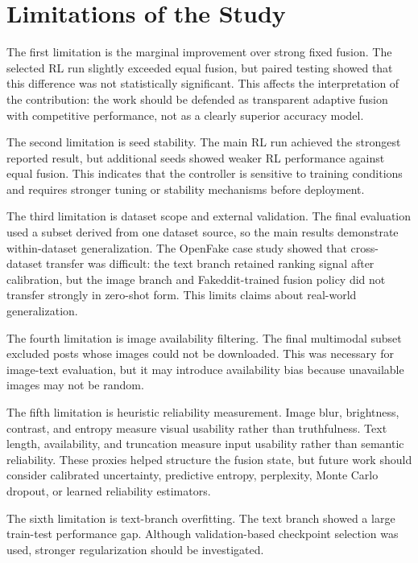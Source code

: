 \section{Limitations of the Study}


The first limitation is the marginal improvement over strong fixed fusion. The selected RL run slightly exceeded equal fusion, but paired testing showed that this difference was not statistically significant. This affects the interpretation of the contribution: the work should be defended as transparent adaptive fusion with competitive performance, not as a clearly superior accuracy model.


The second limitation is seed stability. The main RL run achieved the strongest reported result, but additional seeds showed weaker RL performance against equal fusion. This indicates that the controller is sensitive to training conditions and requires stronger tuning or stability mechanisms before deployment.


The third limitation is dataset scope and external validation. The final evaluation used a subset derived from one dataset source, so the main results demonstrate within-dataset generalization. The OpenFake case study showed that cross-dataset transfer was difficult: the text branch retained ranking signal after calibration, but the image branch and Fakeddit-trained fusion policy did not transfer strongly in zero-shot form. This limits claims about real-world generalization.


The fourth limitation is image availability filtering. The final multimodal subset excluded posts whose images could not be downloaded. This was necessary for image-text evaluation, but it may introduce availability bias because unavailable images may not be random.


The fifth limitation is heuristic reliability measurement. Image blur, brightness, contrast, and entropy measure visual usability rather than truthfulness. Text length, availability, and truncation measure input usability rather than semantic reliability. These proxies helped structure the fusion state, but future work should consider calibrated uncertainty, predictive entropy, perplexity, Monte Carlo dropout, or learned reliability estimators.


The sixth limitation is text-branch overfitting. The text branch showed a large train-test performance gap. Although validation-based checkpoint selection was used, stronger regularization should be investigated.


